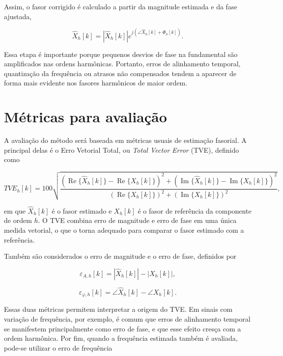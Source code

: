 Assim, o fasor corrigido é calculado a partir da magnitude estimada e da fase ajustada,

\begin{equation}
\hat{X}_h[k] = |\hat{X}_h[k]|e^{j(\angle \hat{X}_h[k] + \Phi_h[k])}.
\label{eq:fasor_corrigido}
\end{equation}

Essa etapa é importante porque pequenos desvios de fase na fundamental são amplificados nas ordens harmônicas. Portanto, erros de alinhamento temporal, quantização da frequência ou atrasos não compensados tendem a aparecer de forma mais evidente nos fasores harmônicos de maior ordem.

\section{Métricas para avaliação}

A avaliação do método será baseada em métricas usuais de estimação fasorial. A principal delas é o Erro Vetorial Total, ou \textit{Total Vector Error} (TVE), definido como

\begin{equation}
TVE_h[k] =
100
\sqrt{
\frac{
\left(\operatorname{Re}\{\hat{X}_h[k]\}-\operatorname{Re}\{X_h[k]\}\right)^2+
\left(\operatorname{Im}\{\hat{X}_h[k]\}-\operatorname{Im}\{X_h[k]\}\right)^2
}{
\left(\operatorname{Re}\{X_h[k]\}\right)^2+
\left(\operatorname{Im}\{X_h[k]\}\right)^2
}
},
\label{eq:tve_metodologia}
\end{equation}

\noindent em que $\hat{X}_h[k]$ é o fasor estimado e $X_h[k]$ é o fasor de referência da componente de ordem $h$. O TVE combina erro de magnitude e erro de fase em uma única medida vetorial, o que o torna adequado para comparar o fasor estimado com a referência.

Também são considerados o erro de magnitude e o erro de fase, definidos por

\begin{equation}
\varepsilon_{A,h}[k] = |\hat{X}_h[k]| - |X_h[k]|,
\label{eq:erro_magnitude}
\end{equation}

\begin{equation}
\varepsilon_{\varphi,h}[k] = \angle \hat{X}_h[k] - \angle X_h[k].
\label{eq:erro_fase}
\end{equation}

Essas duas métricas permitem interpretar a origem do TVE. Em sinais com variação de frequência, por exemplo, é comum que erros de alinhamento temporal se manifestem principalmente como erro de fase, e que esse efeito cresça com a ordem harmônica. Por fim, quando a frequência estimada também é avaliada, pode-se utilizar o erro de frequência

